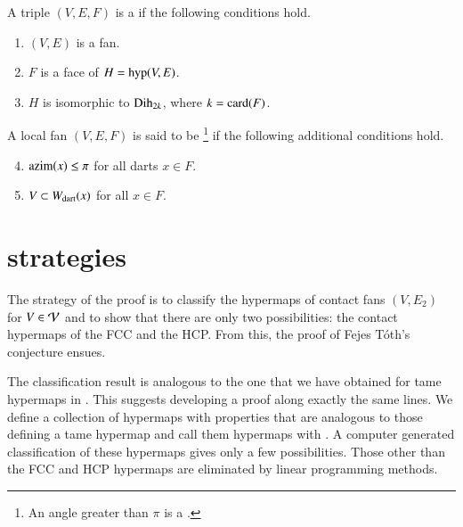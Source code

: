 \documentclass{llncs}
\def\op#1{{\hbox{#1}}}
\begin{document}
\begin{definition} \label{def:convex-local}
A triple $(V,E,F)$ is a  if the following conditions hold.
\begin{enumerate} 
\item {} $(V,E)$ is a fan.
\item {} $F$ is a face of $H = \op{hyp}(V,E)$.
\item {} $H$ is isomorphic to $\op{Dih}_{2k}$, where $k =
\card(F)$.
\end{enumerate}
A local fan $(V,E,F)$ is said to be \footnote{An angle
greater than $\pi$ is a .} if the following
additional conditions hold.
\begin{enumerate}
\setcounter{enumi}{3}
\item %
 $\op{azim}(x)\le \pi$ for all darts $x\in F$.
\item {} $V\subset W_{\text{dart}}(x)$ for all $x\in F$.
\end{enumerate}
\end{definition}
%

\section{strategies}

The strategy of the proof is to classify the hypermaps of contact
fans $(V,E_{2})$ for $V\in {\mathcal V}$ and to show that there are only two
possibilities: the contact hypermaps of the FCC and the HCP.  From
this, the proof of Fejes T\'oth's conjecture ensues.

The classification result is analogous to the one that we have 
obtained for tame hypermaps in \cite{DSP}.  
This suggests developing a proof along
exactly the same lines.  We define a 
collection of hypermaps with properties that are analogous to those
defining a tame hypermap and call them hypermaps with 
.  A computer generated classification of these hypermaps
gives only a few possibilities.  Those other than the FCC and
HCP hypermaps are eliminated by linear programming methods.
\end{document}
